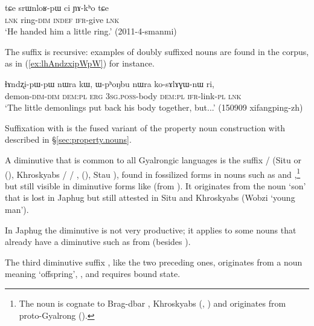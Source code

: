 \begin{exe}
\ex \label{ex:srWnloR}
\gll tɕe srɯnloʁ-pɯ ci ɲɤ-kʰo tɕe \\
\textsc{lnk} ring-\textsc{dim} \textsc{indef} \textsc{ifr}-give \textsc{lnk} \\
\glt `He handed him a little ring.' (2011-4-smanmi)
\end{exe}

The suffix  is recursive: examples of doubly suffixed nouns are found in the corpus, as in (\ref{ex:lhAndzxipWpW}) for instance. 

\begin{exe}
\ex \label{ex:lhAndzxipWpW}
\gll ɬɤndʐi-pɯ-pɯ nɯra kɯ, ɯ-pʰoŋbu nɯra ko-sɤlɤɣɯ-nɯ ri, \\
demon-\textsc{dim}-\textsc{dim} \textsc{dem}:\textsc{pl} \textsc{erg} \textsc{3sg}.\textsc{poss}-body \textsc{dem}:\textsc{pl} \textsc{ifr}-link-\textsc{pl} \textsc{lnk} \\
\glt `The little demonlings put back his body together, but...' (150909 xifangping-zh) 
\end{exe}

Suffixation with  is the fused variant of the property noun construction with  described in §\ref{sec:property.nouns}.

A diminutive that is common to all Gyalrongic languages is the suffix / (Situ  or  (\citealt[163]{linxr93jiarong}), Khroskyabs  /  / ,  (\citealt[158]{lai17khroskyabs}), Stau ), found in fossilized forms in nouns such as  and ,\footnote{The noun  is cognate to Brag-dbar , Khroskyabs  (\citealt{zhang16bragdbar}, \citealt[156]{lai17khroskyabs}) and originates from proto-Gyalrong  (\citealt[53]{jacques08}). } but still visible in diminutive forms like  (from ). It originates from the noun `son' that is lost in Japhug but still attested in Situ and Khroskyabs (Wobzi  `young man'). 

In Japhug the  diminutive is not very productive; it applies to some nouns that already have a  diminutive such as  from  (besides ).

The third diminutive suffix , like the two preceding ones, originates from a noun meaning `offspring', , and requires bound state.

